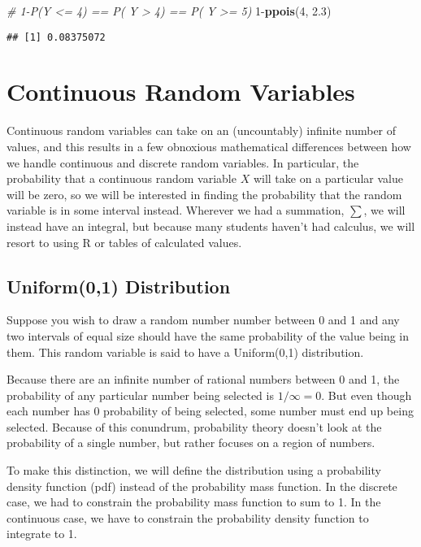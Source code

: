 \documentclass[]{book}
\newenvironment{Shaded}{\begin{snugshade}}{\end{snugshade}}
\newcommand{\KeywordTok}[1]{\textcolor[rgb]{0.13,0.29,0.53}{\textbf{{#1}}}}
\newcommand{\DecValTok}[1]{\textcolor[rgb]{0.00,0.00,0.81}{{#1}}}
\newcommand{\FloatTok}[1]{\textcolor[rgb]{0.00,0.00,0.81}{{#1}}}
\newcommand{\CommentTok}[1]{\textcolor[rgb]{0.56,0.35,0.01}{\textit{{#1}}}}
\newcommand{\NormalTok}[1]{{#1}}
\begin{document}
\begin{Shaded}
\begin{Highlighting}[]
\CommentTok{# 1-P(Y <= 4)  ==  P( Y > 4)  ==  P( Y >= 5)}
\DecValTok{1}\NormalTok{-}\KeywordTok{ppois}\NormalTok{(}\DecValTok{4}\NormalTok{, }\FloatTok{2.3}\NormalTok{)}
\end{Highlighting}
\end{Shaded}

\begin{verbatim}
## [1] 0.08375072
\end{verbatim}

\section{Continuous Random Variables}\label{continuous-random-variables}

Continuous random variables can take on an (uncountably) infinite number
of values, and this results in a few obnoxious mathematical differences
between how we handle continuous and discrete random variables. In
particular, the probability that a continuous random variable \(X\) will
take on a particular value will be zero, so we will be interested in
finding the probability that the random variable is in some interval
instead. Wherever we had a summation, \(\sum\), we will instead have an
integral, but because many students haven't had calculus, we will resort
to using R or tables of calculated values.

\subsection{Uniform(0,1) Distribution}\label{uniform01-distribution}

Suppose you wish to draw a random number number between 0 and 1 and any
two intervals of equal size should have the same probability of the
value being in them. This random variable is said to have a Uniform(0,1)
distribution.

Because there are an infinite number of rational numbers between 0 and
1, the probability of any particular number being selected is
\(1/\infty=0\). But even though each number has 0 probability of being
selected, some number must end up being selected. Because of this
conundrum, probability theory doesn't look at the probability of a
single number, but rather focuses on a region of numbers.

To make this distinction, we will define the distribution using a
probability density function (pdf) instead of the probability mass
function. In the discrete case, we had to constrain the probability mass
function to sum to 1. In the continuous case, we have to constrain the
probability density function to integrate to 1.
\end{document}
